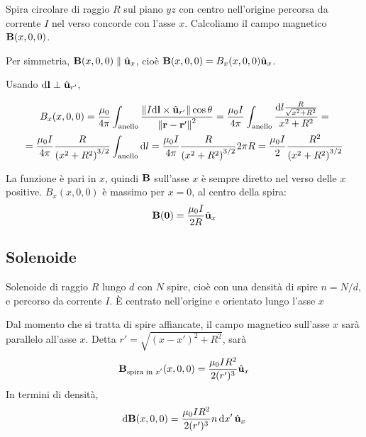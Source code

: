 
Spira circolare di raggio $R$ sul piano $yz$ con centro nell'origine percorsa da corrente $I$ nel verso concorde con l'asse $x$.
Calcoliamo il campo magnetico $\mathbf{B}(x, 0, 0)$.

Per simmetria, $\mathbf{B}(x, 0, 0) \parallel \hat{\mathbf{u}}_{x}$, cioè $\mathbf{B}(x, 0, 0) = B_x(x, 0, 0)\hat{\mathbf{u}}_{x}$.

Usando $\mathrm{d} \mathbf{l} \perp \hat{\mathbf{u}}_{r'}$,

\begin{equation}
\begin{gathered}
\label{eq:campo_spira}
    B_x(x, 0, 0) = \frac{\mu_0}{4\pi} \int_\mathrm{anello} \frac{\left\lVert I \mathrm{d} \mathbf{l} \times \hat{\mathbf{u}}_{r'} \right\rVert \cos \theta}{\left\lVert \mathbf{r} - \mathbf{r}' \right\rVert^2}
    = \frac{\mu_0 I}{4\pi} \int_\mathrm{anello} \frac{\mathrm{d} l \frac{R}{\sqrt{x^2 + R^2}}}{x^2 + R^2} = \\
    = \frac{\mu_0 I}{4\pi} \frac{R}{\left( x^2 + R^2 \right)^{3/2}} \int_\mathrm{anello} \mathrm{d} l
    = \frac{\mu_0 I}{4\pi} \frac{R}{\left( x^2 + R^2 \right)^{3/2}} 2 \pi R
    = \frac{\mu_0 I}{2} \frac{R^2}{\left( x^2 + R^2 \right)^{3/2}}
\end{gathered}
\end{equation}

La funzione è pari in $x$, quindi $\mathbf{B}$ sull'asse $x$ è sempre diretto nel verso delle $x$ positive.
$B_x(x, 0, 0)$ è massimo per $x = 0$, al centro della spira:
\begin{equation}
    \mathbf{B}(\mathbf{0}) = \frac{\mu_0 I}{2 R} \hat{\mathbf{u}}_{x}
\end{equation}



\subsection{Solenoide}

Solenoide di raggio $R$ lungo $d$ con $N$ spire, cioè con una densità di spire $n = N/d$, e percorso da corrente $I$.
È centrato nell'origine e orientato lungo l'asse $x$

Dal momento che si tratta di spire affiancate, il campo magnetico sull'asse $x$ sarà parallelo all'asse $x$. Detta $r' = \sqrt{(x - x')^2 + R^2}$, sarà
\begin{equation}
    \mathbf{B}_\text{spira in $x'$}(x, 0, 0) = \frac{\mu_0 I R^2}{2 (r')^3} \hat{\mathbf{u}}_{x}
\end{equation}
In termini di densità,
\begin{equation}
    \mathrm{d}\mathbf{B}(x, 0, 0) = \frac{\mu_0 I R^2}{2 (r')^3} n \, \mathrm{d} x' \, \hat{\mathbf{u}}_{x}
\end{equation}

